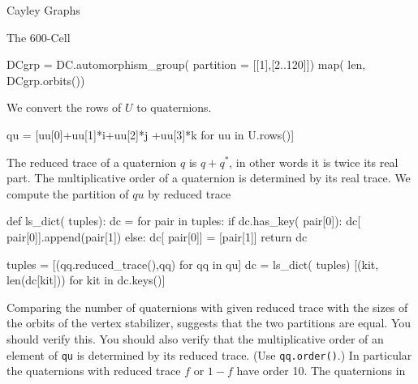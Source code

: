 \begin{chap}{Cayley Graphs}
\begin{sect}{The 600-Cell}
\begin{sagecode}
\begin{sageinput}
DCgrp = DC.automorphism_group( partition = [[1],[2..120]])
map( len, DCgrp.orbits())
\end{sageinput}
\begin{sageoutput}
[12, 12, 20, 20, 12, 12, 1, 30, 1]
\end{sageoutput}
\end{sagecode}
%
\begin{para}
We convert the rows of $U$ to quaternions.
\end{para}
%
\begin{sagecode}
\begin{sageinput}
qu = [uu[0]+uu[1]*i+uu[2]*j +uu[3]*k for uu in U.rows()]
\end{sageinput}
\end{sagecode}
%
\begin{para}
The reduced trace of a quaternion $q$ is $q+q^*$, in other words it is
twice its real part. The multiplicative order of a quaternion is determined
by its real trace. We compute the partition of $qu$ by reduced trace
\end{para}
%
\begin{sagecode}
\begin{sageinput}
def ls_dict( tuples):
    dc = {} 
    for pair in tuples:
        if dc.has_key( pair[0]):
            dc[ pair[0]].append(pair[1])
        else:
            dc[ pair[0]] = [pair[1]]
    return dc
\end{sageinput}
\end{sagecode}
%
\begin{sagecode}
\begin{sageinput}
tuples = [(qq.reduced_trace(),qq) for qq in qu]
dc = ls_dict( tuples)
[(kit, len(dc[kit])) for kit in dc.keys()]
\end{sageinput}
\begin{sageoutput}
[(0, 30), (1, 20), (2, 1), (-f, 12), (-f + 1, 12), 
(f - 1, 12), (f, 12), (-2, 1), (-1, 20)]
\end{sageoutput}
\end{sagecode}
%
\begin{para}
Comparing the number of quaternions with given reduced trace with the
sizes of the orbits of the vertex stabilizer, suggests that the two partitions
are equal. You should verify this. You should also verify that the
multiplicative order of an element of \verb|qu| is determined by its 
reduced trace. (Use \verb|qq.order()|.) In particular the quaternions
with reduced trace $f$ or $1-f$ have order 10. The quaternions in

\end{para}
\end{sect}
\end{chap}
